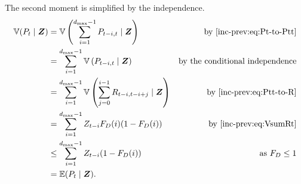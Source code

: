 \documentclass[thesis.tex]{subfiles}
\begin{document}
The second moment is simplified by the independence.
\begin{align}
\V(P_t \mid \vec{Z})
  &= \V\left(\sum_{i=1}^{d_\text{max}-1} P_{t-i,t} \mid \vec{Z} \right) &\text{by \cref{inc-prev:eq:Pt-to-Ptt}} \\
  &= \sum_{i=1}^{d_\text{max}-1} \V\left(P_{t-i,t} \mid \vec{Z} \right) &\text{by the conditional independence} \\
  &= \sum_{i=1}^{d_\text{max}-1} \V\left(\sum_{j=0}^{i-1} R_{t-i,t-i+j} \mid \vec{Z} \right) &\text{by~\cref{inc-prev:eq:Ptt-to-R}}\\
  &= \sum_{i=1}^{d_\text{max}-1} Z_{t-i} F_D(i) (1 - F_D(i)) &\text{by~\cref{inc-prev:eq:VsumRt}} \\
  &\leq \sum_{i=1}^{d_\text{max}-1} Z_{t-i} (1 - F_D(i)) &\text{as $F_D \leq 1$}\\
  &= \E(P_t \mid \vec{Z}). \label{inc-prev:eq:boundVPt}
\end{align}


\end{document}
